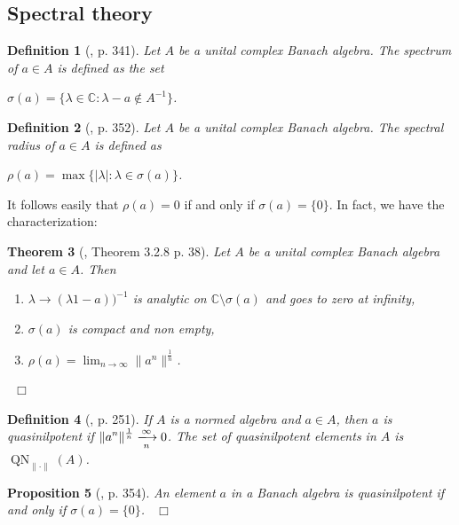 \documentclass[12pt, oneside]{book}
\newtheorem{theorem}{Theorem}[subsection]
\newtheorem{proposition}[theorem]{Proposition}
\newtheorem{definition}[theorem]{Definition}
\newcommand{\qed}{\hfill ~$\Box$\\}
\def\QN{\operatorname{QN}}
\def\max{\operatorname{max}}
\begin{document}
\subsection{Spectral theory}

\begin{definition}[\cite{H1}, p. 341] 
\normalfont
Let $A$ be a unital complex Banach algebra. The {\sl spectrum} of $a \in A$ is defined 
as the set 
\begin{center}
$\sigma(a) = \{ \lambda \in \mathbb{C}: \lambda -a \not \in A^{-1} \}$.
\end{center}
\end{definition}
\begin{definition}[\cite{H1}, p. 352] 
\normalfont
\noindent Let $A$ be a unital complex Banach algebra. 
The {\sl spectral radius} of $a \in  A$ is defined as 
\begin{center}
$\rho(a) = \max \{ |\lambda|: \lambda \in \sigma(a) \}$. 
\end{center}
\end{definition}
It follows easily that $\rho(a)=0$ if and only if $\sigma(a)=\{0\}$. In fact, we have the characterization:
\begin{theorem}[\cite{A}, Theorem 3.2.8 p. 38] \label{SpectrumCompact}
\normalfont
\noindent Let $A$ be a unital complex Banach algebra and let $a \in A$. Then
\begin{enumerate}[label=(\alph*)] 

\item $\lambda \rightarrow (\lambda 1 - a))^{-1}$ is analytic on $\mathbb{C} \setminus \sigma(a)$ 
and goes to zero at infinity,
\item $\sigma(a)$ is compact and non empty,
\item $\rho(a) = \displaystyle{\lim_{n \to \infty}} \| a^{n} \|^{\frac{1}{n}}$. 
\end{enumerate}
\qed
\end{theorem}

\begin{definition}[\cite{H1}, p. 251] 
\normalfont
\noindent If $A$ is a normed algebra and $a \in A$, then $a$ is {\sl quasinilpotent} if 
$\displaystyle{\| a^n \|^{\frac{1}{n}} \xlongrightarrow[n]{\infty} 0}$. The set of quasinilpotent 
elements in $A$ is $\QN_{\| \cdot \|}(A)$.
\end{definition}


\begin{proposition}[\cite{H1}, p. 354] \label{QNs}
\normalfont
\noindent An element $a$ in a Banach algebra is quasinilpotent if and only if $\sigma(a)=\{0\}$.
\qed
\end{proposition}
\end{document}

